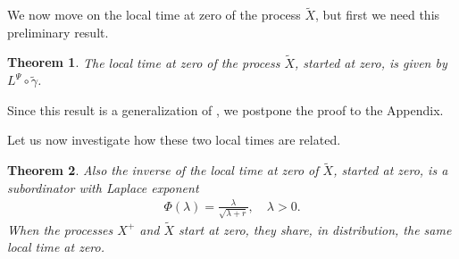 \documentclass[11pt,a4paper]{article}
\newtheorem{theorem}{Theorem}
\theoremstyle{definition}
\theoremstyle{remark}
\begin{document}
We now move on the local time at zero of the process $\widetilde{X}$, but first we need this preliminary result.
\begin{theorem}
	\label{tm:local-time-pallino}
	The local time at zero of the process $\widetilde{X}$, started at zero, is given by $L^\Psi \circ \widetilde{\gamma}$.
\end{theorem}
\noindent
Since this result is a generalization of \cite[Section 14]{ItoMckean}, we postpone the proof to the Appendix.

Let us now investigate how these two local times are related.
\begin{theorem}
	\label{tm:same-local-times}
	Also the inverse of the local time at zero of $\widetilde{X}$, started at zero, is a subordinator with Laplace exponent
	\begin{align*}
		\Phi(\lambda)=\frac{\lambda}{\sqrt{\lambda + r}}, \quad \lambda >0.
	\end{align*}
	When the processes \(X^+\) and \(\widetilde{X}\) start at zero, they share, in distribution, the same local time at zero.
\end{theorem}
\end{document}
